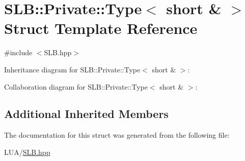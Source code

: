 \hypertarget{structSLB_1_1Private_1_1Type_3_01short_01_6_01_4}{}\section{S\+LB\+:\+:Private\+:\+:Type$<$ short \& $>$ Struct Template Reference}
\label{structSLB_1_1Private_1_1Type_3_01short_01_6_01_4}


{\ttfamily \#include $<$S\+L\+B.\+hpp$>$}



Inheritance diagram for S\+LB\+:\+:Private\+:\+:Type$<$ short \& $>$\+:


Collaboration diagram for S\+LB\+:\+:Private\+:\+:Type$<$ short \& $>$\+:
\subsection*{Additional Inherited Members}


The documentation for this struct was generated from the following file\+:\begin{DoxyCompactItemize}
\item 
L\+U\+A/\hyperlink{SLB_8hpp}{S\+L\+B.\+hpp}\end{DoxyCompactItemize}
